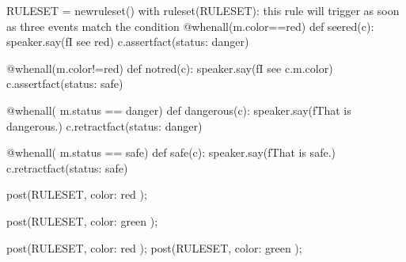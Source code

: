 \documentclass[letterpaper,10pt,english]{sphinxmanual}
\begin{document}
{{\begin{sphinxVerbatim}[commandchars=\\\{\}]
RULESET = new\PYGZus{}ruleset()
with ruleset(RULESET):
    \PYGZsh{} this rule will trigger as soon as three events match the condition
    @when\PYGZus{}all(m.color==\PYGZsq{}red\PYGZsq{})
    def see\PYGZus{}red(c):
        speaker.say(f\PYGZsq{}I see red\PYGZsq{})
        c.assert\PYGZus{}fact(\PYGZob{}\PYGZsq{}status\PYGZsq{}: \PYGZsq{}danger\PYGZsq{}\PYGZcb{})

    @when\PYGZus{}all(m.color!=\PYGZsq{}red\PYGZsq{})
    def not\PYGZus{}red(c):
        speaker.say(f\PYGZsq{}I see \PYGZob{}c.m.color\PYGZcb{}\PYGZsq{})
        c.assert\PYGZus{}fact(\PYGZob{}\PYGZsq{}status\PYGZsq{}: \PYGZsq{}safe\PYGZsq{}\PYGZcb{})

    @when\PYGZus{}all( m.status == \PYGZsq{}danger\PYGZsq{})
    def dangerous(c):
        speaker.say(f\PYGZsq{}That is dangerous.\PYGZsq{})
        c.retract\PYGZus{}fact(\PYGZob{}\PYGZsq{}status\PYGZsq{}: \PYGZsq{}danger\PYGZsq{}\PYGZcb{})

    @when\PYGZus{}all( m.status == \PYGZsq{}safe\PYGZsq{})
    def safe(c):
        speaker.say(f\PYGZsq{}That is safe.\PYGZsq{})
        c.retract\PYGZus{}fact(\PYGZob{}\PYGZsq{}status\PYGZsq{}: \PYGZsq{}safe\PYGZsq{}\PYGZcb{})

\end{sphinxVerbatim}
}

{
\begin{sphinxVerbatim}[commandchars=\\\{\}]
\llap{\color{nbsphinxin}[ ]:\,\hspace{\fboxrule}\hspace{\fboxsep}}post(RULESET, \PYGZob{}\PYGZsq{}color\PYGZsq{}: \PYGZsq{}red\PYGZsq{} \PYGZcb{});
\end{sphinxVerbatim}
}

{
\begin{sphinxVerbatim}[commandchars=\\\{\}]
\llap{\color{nbsphinxin}[ ]:\,\hspace{\fboxrule}\hspace{\fboxsep}}post(RULESET, \PYGZob{}\PYGZsq{}color\PYGZsq{}: \PYGZsq{}green\PYGZsq{} \PYGZcb{});
\end{sphinxVerbatim}
}

{
\begin{sphinxVerbatim}[commandchars=\\\{\}]
\llap{\color{nbsphinxin}[ ]:\,\hspace{\fboxrule}\hspace{\fboxsep}}post(RULESET, \PYGZob{}\PYGZsq{}color\PYGZsq{}: \PYGZsq{}red\PYGZsq{} \PYGZcb{});
post(RULESET, \PYGZob{}\PYGZsq{}color\PYGZsq{}: \PYGZsq{}green\PYGZsq{} \PYGZcb{});
\end{sphinxVerbatim}
}


}
\end{document}
